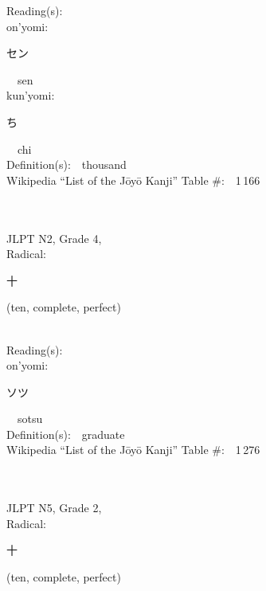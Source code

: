 \begin{multicols}{2}
Reading(s):\ \ \\
{\hspace*{1em}}on'yomi:\ \ \\
{\hspace*{2em}}{\begin{CJK}{UTF8}{min} セン \end{CJK}}\ \ sen\ \ \\
{\hspace*{1em}}kun'yomi:\ \ \\
{\hspace*{2em}}{\begin{CJK}{UTF8}{min} ち \end{CJK}}\ \ chi\ \ \\
Definition(s):\ \ thousand \\
Wikipedia ``List of the J\=oy\=o Kanji'' Table \#:\ \ 1\,166 \\
\ \ \\
{\fontsize{34pt}{40pt}  }\ \ \\  %
{JLPT N2, Grade 4, \\Radical:\ \ {\begin{CJK}{UTF8}{min} 十 \end{CJK}} (ten, complete, perfect) } \\
Reading(s):\ \ \\
{\hspace*{1em}}on'yomi:\ \ \\
{\hspace*{2em}}{\begin{CJK}{UTF8}{min} ソツ \end{CJK}}\ \ sotsu\ \ \\
Definition(s):\ \ graduate \\
Wikipedia ``List of the J\=oy\=o Kanji'' Table \#:\ \ 1\,276 \\
\ \ \\
{\fontsize{34pt}{40pt}  }\ \ \\  %
{JLPT N5, Grade 2, \\Radical:\ \ {\begin{CJK}{UTF8}{min} 十 \end{CJK}} (ten, complete, perfect) } \\

\end{multicols}
